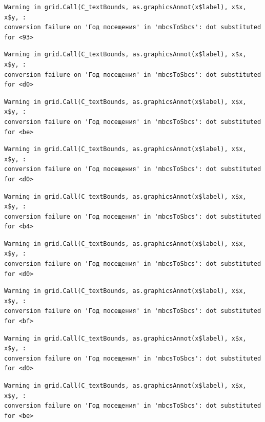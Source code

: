 \documentclass[
  letterpaper,
  DIV=11,
  numbers=noendperiod]{scrartcl}
\begin{document}
\begin{verbatim}
Warning in grid.Call(C_textBounds, as.graphicsAnnot(x$label), x$x, x$y, :
conversion failure on 'Год посещения' in 'mbcsToSbcs': dot substituted for <93>
\end{verbatim}

\begin{verbatim}
Warning in grid.Call(C_textBounds, as.graphicsAnnot(x$label), x$x, x$y, :
conversion failure on 'Год посещения' in 'mbcsToSbcs': dot substituted for <d0>
\end{verbatim}

\begin{verbatim}
Warning in grid.Call(C_textBounds, as.graphicsAnnot(x$label), x$x, x$y, :
conversion failure on 'Год посещения' in 'mbcsToSbcs': dot substituted for <be>
\end{verbatim}

\begin{verbatim}
Warning in grid.Call(C_textBounds, as.graphicsAnnot(x$label), x$x, x$y, :
conversion failure on 'Год посещения' in 'mbcsToSbcs': dot substituted for <d0>
\end{verbatim}

\begin{verbatim}
Warning in grid.Call(C_textBounds, as.graphicsAnnot(x$label), x$x, x$y, :
conversion failure on 'Год посещения' in 'mbcsToSbcs': dot substituted for <b4>
\end{verbatim}

\begin{verbatim}
Warning in grid.Call(C_textBounds, as.graphicsAnnot(x$label), x$x, x$y, :
conversion failure on 'Год посещения' in 'mbcsToSbcs': dot substituted for <d0>
\end{verbatim}

\begin{verbatim}
Warning in grid.Call(C_textBounds, as.graphicsAnnot(x$label), x$x, x$y, :
conversion failure on 'Год посещения' in 'mbcsToSbcs': dot substituted for <bf>
\end{verbatim}

\begin{verbatim}
Warning in grid.Call(C_textBounds, as.graphicsAnnot(x$label), x$x, x$y, :
conversion failure on 'Год посещения' in 'mbcsToSbcs': dot substituted for <d0>
\end{verbatim}

\begin{verbatim}
Warning in grid.Call(C_textBounds, as.graphicsAnnot(x$label), x$x, x$y, :
conversion failure on 'Год посещения' in 'mbcsToSbcs': dot substituted for <be>
\end{verbatim}
\end{document}
